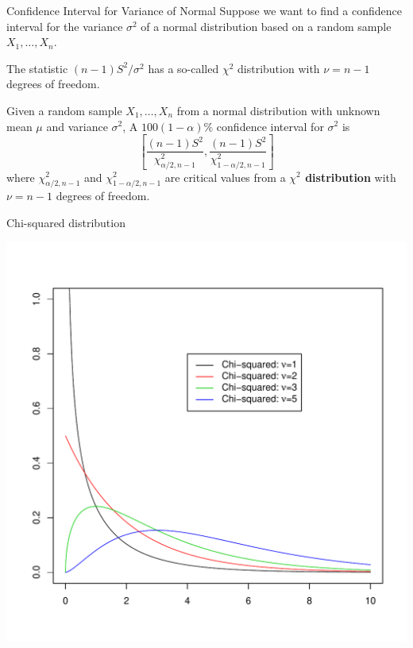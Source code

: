 \documentclass{beamer}
\renewcommand{\emph}{\textbf}
\begin{document}
\begin{frame}{Confidence Interval for Variance of Normal}
Suppose we want to find a confidence interval for the variance $\sigma^2$ of a normal distribution based on a random sample $X_1,\dots,X_n$.

\pause \vspace{.2cm}
The statistic $(n-1)S^2/\sigma^2$ has a so-called $\chi^2$ distribution with $\nu=n-1$ degrees of freedom.

\pause \begin{block}{}
Given a random sample $X_1,\dots,X_n$ from a normal distribution with unknown mean $\mu$ and variance $\sigma^2$,
A $100(1-\alpha)\%$ confidence interval for $\sigma^2$ is
$$\left[\frac{(n-1)S^2}{\chi^2_{\alpha/2,n-1}}, \frac{(n-1)S^2}{\chi^2_{1-\alpha/2,n-1}}\right]$$
where $\chi^2_{\alpha/2,n-1}$ and $\chi^2_{1-\alpha/2,n-1}$ are critical values from a \emph{$\chi^2$ distribution} with $\nu=n-1$ degrees of freedom.
\end{block}
\end{frame}

\begin{frame}{Chi-squared distribution}
\vspace{-1cm}
\begin{center}
\includegraphics[scale=.5]{chisq.pdf}
\end{center}
\end{frame}
\end{document}
